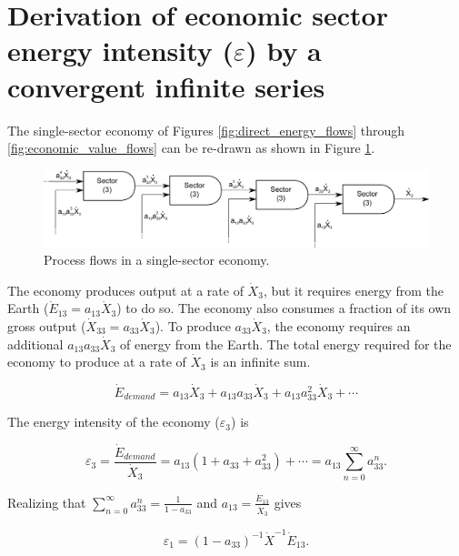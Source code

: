\section{Derivation of economic sector energy intensity ($\varepsilon$) by a convergent infinite series}

The single-sector economy of Figures \ref{fig:direct_energy_flows} through \ref{fig:economic_value_flows} can be re-drawn as shown in Figure \ref{fig:single_sector_flows_3}.

\begin{figure}[h!]
\includegraphics[width=1.0\linewidth]{Chapter_Example_B/images/Heun_I-O_Process_Equivalence_3.pdf}
\caption{Process flows in a single-sector economy.}
\label{fig:single_sector_flows_3}
\end{figure}

The economy produces output at a rate of $\dot{X}_{3}$, but it requires energy from the Earth ($\dot{E}_{13} = a_{13}\dot{X}_{3}$) to do so. The economy also consumes a fraction of its own gross output ($\dot{X}_{33} = a_{33}\dot{X}_{3}$). To produce $a_{33}\dot{X}_{3}$, the economy requires an additional $a_{13}a_{33}\dot{X}_{3}$ of energy from the Earth. The total energy required for the economy to produce at a rate of $\dot{X}_{3}$ is an infinite sum.

\begin{equation} \label{eq:E_dot_demand_SS}
	\dot{E}_{demand} = a_{13}\dot{X}_{3} + a_{13}a_{33}\dot{X}_{3} + a_{13}a_{33}^2\dot{X}_{3} + \cdots
\end{equation}

The energy intensity of the economy ($\varepsilon_{3}$) is 

\begin{equation} \label{eq:epsilon_process_SS_intermediate}
	\varepsilon_{3} = \frac{\dot{E}_{demand}}{\dot{X}_{3}} = a_{13}(1 + a_{33} + a_{33}^2) + \cdots = a_{13}\sum_{n=0}^{\infty}a_{33}^{n}.
\end{equation}

Realizing that $\sum_{n=0}^{\infty}a_{33}^{n} = \frac{1}{1-a_{33}}$ and $a_{13} = \frac{\dot{E}_{13}}{\dot{X}_{3}}$ gives

\begin{equation} \label{eq:epsilon_process_SS}
	\varepsilon_{1} = (1-a_{33})^{-1} \dot{X}^{-1} \dot{E}_{13}.
\end{equation}


